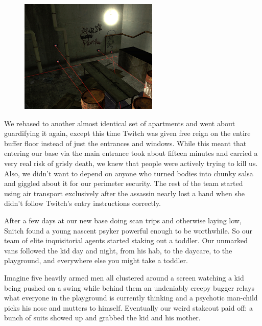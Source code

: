 \begin{figure}
	\begin{center}
		\includegraphics[width=\figwidth]{pics/3/12.png}
	\end{center}
\end{figure}
We rebased to another almost identical set of apartments and went about guardifying it again, except this time Twitch was given free reign on the entire buffer floor instead of just the entrances and windows. 
While this meant that entering our base via the main entrance took about fifteen minutes and carried a very real risk of grisly death, we knew that people were actively trying to kill us.
Also, we didn’t want to depend on anyone who turned bodies into chunky salsa and giggled about it for our perimeter security. 
The rest of the team started using air transport exclusively after the assassin nearly lost a hand when she didn’t follow Twitch’s entry instructions correctly.

After a few days at our new base doing scan trips and otherwise laying low, Snitch found a young nascent psyker powerful enough to be worthwhile.
So our team of elite inquisitorial agents started staking out a toddler. 
Our unmarked vans followed the kid day and night, from his hab, to the daycare, to the playground, and everywhere else you might take a toddler. 

Imagine five heavily armed men all clustered around a screen watching a kid being pushed on a swing while behind them an undeniably creepy bugger relays what everyone in the playground is currently thinking and a psychotic man-child picks his nose and mutters to himself. 
Eventually our weird stakeout paid off: a bunch of suits showed up and grabbed the kid and his mother.

